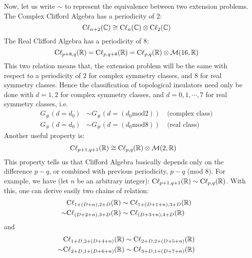 Now, let us write $\sim$ to represent the equivalence between two extension
problems.  The Complex Clifford Algebra has a periodicity of $2$:
\begin{equation}
    \mathrm{C\ell}_{n+2}(\mathbb{C}) \cong \mathrm{C\ell}_{n}(\mathbb{C})\otimes
    \mathrm{C\ell}_{2}(\mathbb{C})
\end{equation}
The Real Clifford Algebra has a periodicity of $8$:
\begin{equation}
    \mathrm{C\ell}_{p+8,q}(\mathbb{R}) = \mathrm{C\ell}_{p,q+8}(\mathbb{R}) =
    \mathrm{C\ell}_{p,q}(\mathbb{R})\otimes\mathcal{M}(16,\mathbb{R})
\end{equation}
This two relation means that, the extension problem will be the same with respect to
a periodicity of $2$ for complex symmetry classes, and $8$ for real symmetry
classes. Hence the classification of topological insulators need only be done
with $d=1,2$ for complex symmetry classes, and $d=0,1,\cdots,7$ for real
symmetry classes, i.e.
\begin{subequations}
    \label{eq:cli-periodic}
\begin{align}
    G_{\#}(d=d_0) &\sim G_{\#}(d=(d_0 \text{mod} 2)) \quad\text{(complex class)} \\
    G_{\#}(d=d_0) &\sim G_{\#}(d=(d_0 \text{mod} 8)) \quad\text{(real class)}
\end{align}
\end{subequations}
Another useful property is:
\begin{align}
    \mathrm{C\ell}_{p+1,q+1}(\mathbb{R}) &\cong
    \mathrm{C\ell}_{p,q}(\mathbb{R})\otimes\mathcal{M}(2,\mathbb{R})
\end{align}
This property tells us that Clifford Algebra basically depends only on the
difference $p-q$, or combined with previous periodicity, $p-q$ (mod $8$). For
example, we have (let $n$ be an arbitrary integer):
$\mathrm{C\ell}_{p+1,q+1}(\mathbb{R})\sim\mathrm{C\ell}_{p,q}(\mathbb{R})$. With this, one can
derive easily two chains of relation:
\begin{align}
    &\mathrm{C\ell}_{1+(D+n),2+D}(\mathbb{R}) \sim \mathrm{C\ell}_{1+(D+1+n),3+D}(\mathbb{R})
    \nonumber\\
    \sim & \mathrm{C\ell}_{(D+2+n),3+D}(\mathbb{R}) \sim \mathrm{C\ell}_{(D+3+n),4+D}(\mathbb{R})
\end{align}
and
\begin{align}
    &\mathrm{C\ell}_{1+D,2+(D+4+n)}(\mathbb{R})\sim \mathrm{C\ell}_{2+D,2+(D+5+n)}(\mathbb{R})
    \nonumber\\
    \sim& \mathrm{C\ell}_{2+D,1+(D+6+n)}(\mathbb{R}) \sim
    \mathrm{C\ell}_{3+D,1+(D+7+n)}(\mathbb{R})
\end{align}
